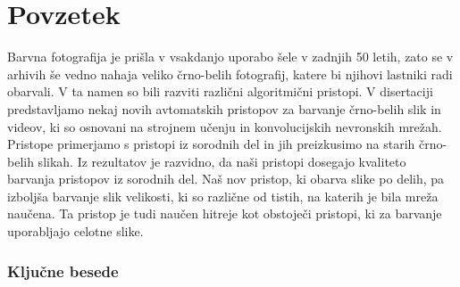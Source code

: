 \chapter*{Povzetek}


Barvna fotografija je prišla v vsakdanjo uporabo šele v zadnjih 50 letih, zato se v arhivih še vedno nahaja veliko črno-belih fotografij, katere bi njihovi lastniki radi obarvali. V ta namen so bili razviti različni algoritmični pristopi.
V disertaciji predstavljamo nekaj novih avtomatskih pristopov za barvanje črno-belih slik in videov, ki so osnovani na strojnem učenju in konvolucijskih nevronskih mrežah. Pristope primerjamo s pristopi iz sorodnih del in jih preizkusimo na starih črno-belih slikah. 
Iz rezultatov je razvidno, da naši pristopi dosegajo kvaliteto barvanja pristopov iz sorodnih del. Naš nov pristop, ki obarva slike po delih, pa izboljša barvanje slik velikosti, ki so različne od tistih, na katerih je bila mreža naučena. Ta pristop je tudi naučen hitreje kot obstoječi pristopi, ki za barvanje uporabljajo celotne slike. 

\subsection*{Ključne besede}
\textit{\tkeywords}
\clearemptydoublepage